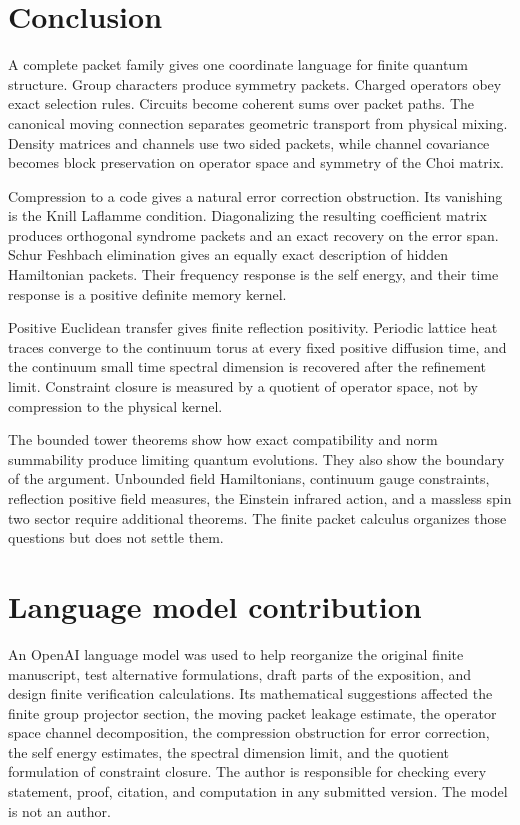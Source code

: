 \documentclass{aomart}
\theoremstyle{definition}
\theoremstyle{remark}
\begin{document}
\section{Conclusion}\label{sec:conclusion}

A complete packet family gives one coordinate language for finite quantum structure. Group characters produce symmetry packets. Charged operators obey exact selection rules. Circuits become coherent sums over packet paths. The canonical moving connection separates geometric transport from physical mixing. Density matrices and channels use two sided packets, while channel covariance becomes block preservation on operator space and symmetry of the Choi matrix.

Compression to a code gives a natural error correction obstruction. Its vanishing is the Knill Laflamme condition. Diagonalizing the resulting coefficient matrix produces orthogonal syndrome packets and an exact recovery on the error span. Schur Feshbach elimination gives an equally exact description of hidden Hamiltonian packets. Their frequency response is the self energy, and their time response is a positive definite memory kernel.

Positive Euclidean transfer gives finite reflection positivity. Periodic lattice heat traces converge to the continuum torus at every fixed positive diffusion time, and the continuum small time spectral dimension is recovered after the refinement limit. Constraint closure is measured by a quotient of operator space, not by compression to the physical kernel.

The bounded tower theorems show how exact compatibility and norm summability produce limiting quantum evolutions. They also show the boundary of the argument. Unbounded field Hamiltonians, continuum gauge constraints, reflection positive field measures, the Einstein infrared action, and a massless spin two sector require additional theorems. The finite packet calculus organizes those questions but does not settle them.

\section*{Language model contribution}

An OpenAI language model was used to help reorganize the original finite manuscript, test alternative formulations, draft parts of the exposition, and design finite verification calculations. Its mathematical suggestions affected the finite group projector section, the moving packet leakage estimate, the operator space channel decomposition, the compression obstruction for error correction, the self energy estimates, the spectral dimension limit, and the quotient formulation of constraint closure. The author is responsible for checking every statement, proof, citation, and computation in any submitted version. The model is not an author.



\end{document}
